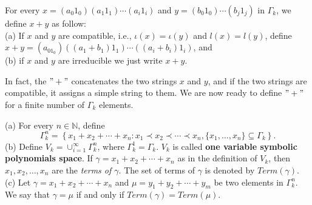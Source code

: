 \documentclass[twoside,11pt]{article}
\begin{document}
\begin{definition}{\label{3.22}}
	For every $x = (a_0 1_0)(a_1 1_1) \cdots (a_i 1_i)$ and $ y = (b_0 1_0)\cdots (b_j 1_j)$ in $\Gamma_k$, we define $x+y$ as follow:\\
	(a) If $x$ and $y$ are compatible, i.e., $\iota(x)=\iota(y)$ and $l(x)=l(y)$, define $x+y=(a_01_0)((a_1+b_1) 1_1) \cdots ((a_i+b_i) 1_i)$, and  \\
	(b) if $x$ and $y$ are irreducible we just write $x+y$. 
\end{definition}
In fact, the $"+"$ concatenates the two strings $x$ and $y$, and if the two strings are compatible, it assigns a simple string to them. We are now ready to define $"+"$ for a finite number of $\Gamma_k$ elements.
\begin{definition}{\label{3.55}}
	(a)	For every $n\in\mathbb{N}$, define 
	\[
	\Gamma_k^n=\left\{ x_1 + x_2 + \cdots + x_n : x_{1}\prec x_{2}\prec\cdots\prec x_{n}, \{x_1,\ldots,x_n\}\subseteq\Gamma_k\right\}.
	\]
	(b) Define $V_k =\cup_{i=1}^\infty \Gamma_k^n$, where $\Gamma_k^1=\Gamma_k$. $V_k$ is called \textbf{one variable symbolic polynomials space}. If \( \gamma = x_1 + x_2 + \cdots + x_n \) as in the definition of \( V_k \), then \( x_1, x_2, \ldots, x_n \) are the \textit{terms of \( \gamma \)}. The set of terms of $\gamma$ is denoted by $Term(\gamma)$.\\
	(c) Let \( \gamma = x_1 + x_2 + \cdots + x_n \) and \( \mu = y_1 + y_2 + \cdots + y_m \) be two elements in \( \Gamma^n_k \). We say that \( \gamma = \mu \) if and only if $Term(\gamma)=Term(\mu)$. 
\end{definition}
\end{document}
